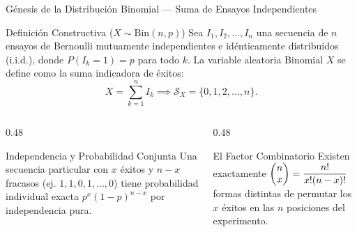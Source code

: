 \documentclass[10pt, aspectratio=169]{beamer}
\begin{document}
\begin{frame}{Génesis de la Distribución Binomial — Suma de Ensayos Independientes}
  \begin{block}{Definición Constructiva ($X \sim \text{Bin}(n, p)$)}
    \footnotesize
    Sea $I_1, I_2, \dots, I_n$ una secuencia de $n$ ensayos de Bernoulli mutuamente independientes e idénticamente distribuidos (i.i.d.), donde $P(I_k = 1) = p$ para todo $k$. La variable aleatoria Binomial $X$ se define como la suma indicadora de éxitos:
    $$X = \sum_{k=1}^n I_k \implies \mathcal{S}_X = \{0, 1, 2, \dots, n\}.$$
  \end{block}
  \vspace{-0.05cm}
  \pause
  \begin{columns}[T]
    \begin{column}{0.48\textwidth}
      \begin{exampleblock}{Independencia y Probabilidad Conjunta}
        \footnotesize
        Una secuencia particular con $x$ éxitos y $n-x$ fracasos (ej. $1, 1, 0, 1, \dots, 0$) tiene probabilidad individual exacta $p^x (1-p)^{n-x}$ por independencia pura.
      \end{exampleblock}
    \end{column}
    \begin{column}{0.48\textwidth}
      \begin{alertblock}{El Factor Combinatorio}
        \footnotesize
        Existen exactamente $\begin{pmatrix} n \\ x \end{pmatrix} = \dfrac{n!}{x!(n-x)!}$ formas distintas de permutar los $x$ éxitos en las $n$ posiciones del experimento.
      \end{alertblock}
    \end{column}
  \end{columns}
\end{frame}
\end{document}

